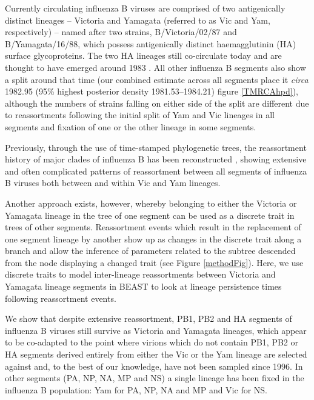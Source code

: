 \documentclass[11pt,oneside,letterpaper]{article}
\begin{document}
Currently circulating influenza B viruses are comprised of two antigenically distinct lineages -- Victoria and Yamagata (referred to as Vic and Yam, respectively) -- named after two strains, B/Victoria/02/87 and B/Yamagata/16/88, which possess antigenically distinct haemagglutinin (HA) surface glycoproteins. 
The two HA lineages still co-circulate today and are thought to have emerged around 1983 \cite{rota1990}. 
All other influenza B segments also show a split around that time (our combined estimate across all segments place it \textit{circa} 1982.95 (95\% highest posterior density 1981.53--1984.21) figure \ref{TMRCAhpd}), although the numbers of strains falling on either side of the split are different due to reassortments following the initial split of Yam and Vic lineages in all segments and fixation of one or the other lineage in some segments.


Previously, through the use of time-stamped phylogenetic trees, the reassortment history of major clades of influenza B has been reconstructed \cite{chen2008}, showing extensive and often complicated patterns of reassortment between all segments of influenza B viruses both between and within Vic and Yam lineages.

Another approach exists, however, whereby belonging to either the Victoria or Yamagata lineage in the tree of one segment can be used as a discrete trait in trees of other segments.
Reassortment events which result in the replacement of one segment lineage by another show up as changes in the discrete trait along a branch and allow the inference of parameters related to the subtree descended from the node displaying a changed trait (see Figure \ref{methodFig}).
Here, we use discrete traits to model inter-lineage reassortments between Victoria and Yamagata lineage segments in BEAST to look at lineage persistence times following reassortment events. 

We show that despite extensive reassortment, PB1, PB2 and HA segments of influenza B viruses still survive as Victoria and Yamagata lineages, which appear to be co-adapted to the point where virions which do not contain PB1, PB2 or HA segments derived entirely from either the Vic or the Yam lineage are selected against and, to the best of our knowledge, have not been sampled since 1996.
In other segments (PA, NP, NA, MP and NS) a single lineage has been fixed in the influenza B population: Yam for PA, NP, NA and MP and Vic for NS.
\end{document}
